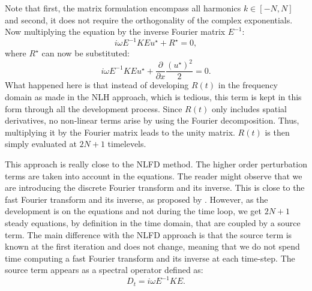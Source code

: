 Note that first, the matrix formulation encompass all harmonics
$k \in [-N, N]$ and second, it does not require the
orthogonality of the complex exponentials.
Now multiplying the equation by the inverse Fourier matrix $E^{-1}$:
\begin{equation}
	i \omega E^{-1} K E u^\star + R^\star = 0,
	\label{eq:sm_hb_matrix_form_mono}
\end{equation}
where $R^\star$ can now be substituted:
\begin{equation}
		i \omega E^{-1} K E u^\star + 
		\displaystyle \frac{\partial}{\partial x}
		\frac{(u^\star)^2}{2} = 0.
\end{equation}
What happened here is that instead of developing $R(t)$
in the frequency domain as made in the NLH approach,
which is tedious, this term is kept
in this form through all the development process. 
Since $R(t)$ only includes spatial derivatives, no non-linear
terms
arise by using the Fourier decomposition. Thus, multiplying it
by the Fourier matrix leads to the unity matrix. 
$R(t)$ is then simply evaluated at $2N+1$ timelevels.

This approach is really close to the NLFD method.
The higher order perturbation terms are taken into account
in the equations.
The reader might observe that we are introducing the discrete Fourier
transform and its inverse. This is close to the fast Fourier transform
and its inverse, as proposed by \citet{McMullen2001}. However,
as the development is on the equations and not during the time loop,
we get $2N+1$ steady equations, by definition in the time
domain, that are coupled by a source term.
The main difference with the NLFD approach
is that the source term is known at the first iteration and does
not change, meaning that we do not spend time computing a
fast Fourier transform and its inverse at each time-step.
The source term appears as a spectral operator defined as:
\begin{equation}
	D_t = i \omega E^{-1} K E.
	\label{eq:sm_hb_mono_source_term_matrix}
\end{equation}

